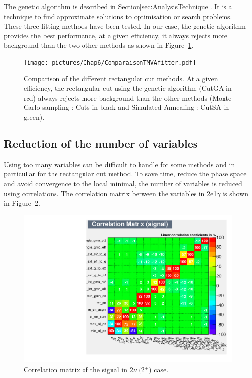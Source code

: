 \documentclass[main.tex]{subfiles}
\begin{document}
\bigskip


\NI The genetic algorithm is described in Section\ref{sec:AnalysisTechnique}. It is a technique to find approximate solutions to optimisation or search problems. These three fitting methods have been tested. In our case, the genetic algorithm provides the best performance, at a given efficiency, it always rejects more background than the two other methods as shown in Figure~\ref{comparisonRC}. 


\begin{figure} [h!]
\begin{center}
\texttt{[image: pictures/Chap6/ComparaisonTMVAfitter.pdf]}
\end{center}
\caption{Comparison of the different rectangular cut methods. At a given efficiency, the rectangular cut using the genetic algorithm (CutGA in red) always rejects more background than the other methods (Monte Carlo sampling : Cuts in black and Simulated Annealing : CutSA in green).}
\label{comparisonRC}
\end{figure}

\FloatBarrier

\subsection{Reduction of the number of variables}\label{sec:ReductionNumberVariables}


\NI Using too many variables can be difficult to handle for some methods and in particuliar for the rectangular cut method. To save time, reduce the phase space and avoid convergence to the local minimal, the number of variables is reduced using correlations. The correlation matrix between the variables in 2e1$\gamma$ is shown in Figure~\ref{CorrelationMatrix}.


\bigskip


\begin{figure} [h!]
\begin{center}
\includegraphics[scale=0.45]{pictures/FinalResults/bb2nu2/150/preselection/CorrelationMatrixBB0nu_2_signal.pdf}
\end{center}
\caption{Correlation matrix of the signal in 2$\nu$ (2$^+$) case.}
\label{CorrelationMatrix}
\end{figure}
\end{document}
